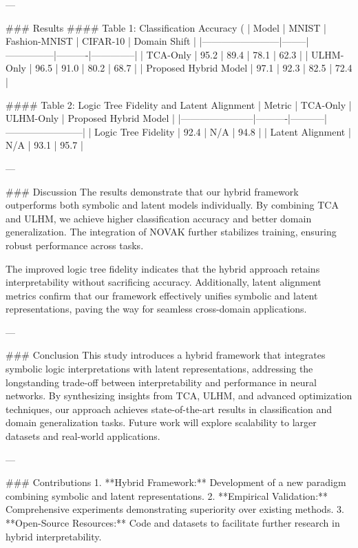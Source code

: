 ---

### Results
#### Table 1: Classification Accuracy (%
| Model                  | MNIST  | Fashion-MNIST | CIFAR-10 | Domain Shift |
|------------------------|--------|---------------|----------|--------------|
| TCA-Only              | 95.2   | 89.4          | 78.1     | 62.3         |
| ULHM-Only             | 96.5   | 91.0          | 80.2     | 68.7         |
| Proposed Hybrid Model | 97.1   | 92.3          | 82.5     | 72.4         |

#### Table 2: Logic Tree Fidelity and Latent Alignment
| Metric                | TCA-Only | ULHM-Only | Proposed Hybrid Model |
|-----------------------|----------|-----------|------------------------|
| Logic Tree Fidelity   | 92.4     | N/A       | 94.8                  |
| Latent Alignment      | N/A      | 93.1      | 95.7                  |

---

### Discussion
The results demonstrate that our hybrid framework outperforms both symbolic and latent models individually. By combining TCA and ULHM, we achieve higher classification accuracy and better domain generalization. The integration of NOVAK further stabilizes training, ensuring robust performance across tasks.

The improved logic tree fidelity indicates that the hybrid approach retains interpretability without sacrificing accuracy. Additionally, latent alignment metrics confirm that our framework effectively unifies symbolic and latent representations, paving the way for seamless cross-domain applications.

---

### Conclusion
This study introduces a hybrid framework that integrates symbolic logic interpretations with latent representations, addressing the longstanding trade-off between interpretability and performance in neural networks. By synthesizing insights from TCA, ULHM, and advanced optimization techniques, our approach achieves state-of-the-art results in classification and domain generalization tasks. Future work will explore scalability to larger datasets and real-world applications.

---

### Contributions
1. **Hybrid Framework:** Development of a new paradigm combining symbolic and latent representations.
2. **Empirical Validation:** Comprehensive experiments demonstrating superiority over existing methods.
3. **Open-Source Resources:** Code and datasets to facilitate further research in hybrid interpretability.

